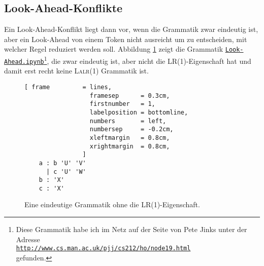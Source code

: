 \subsection{Look-Ahead-Konflikte}
Ein Look-Ahead-Konflikt liegt dann vor, wenn die Grammatik zwar eindeutig ist, aber ein Look-Ahead von einem
Token nicht ausreicht um zu entscheiden,  mit welcher Regel reduziert werden soll.  Abbildung 
\ref{fig:lr-conflict.g} zeigt die Grammatik 
\href{https://github.com/karlstroetmann/Formal-Languages/blob/master/Python/Chapter-10/Look-Ahead.ipynb}{\texttt{Look-Ahead.ipynb}}\footnote{ 
Diese Grammatik habe ich im Netz auf der Seite von Pete Jinks unter der Adresse
\\[0.1cm]
\hspace*{1.3cm}
\href{http://www.cs.man.ac.uk/~pjj/cs212/ho/node19.html}{\texttt{http://www.cs.man.ac.uk/pjj/cs212/ho/node19.html}}
\\[0.1cm]
gefunden.},
die zwar eindeutig ist, aber nicht die LR(1)-Eigenschaft hat und damit erst recht keine \textsc{Lalr}(1) Grammatik ist.

\begin{figure}[!ht]
\centering
\begin{Verbatim}[ frame         = lines, 
                  framesep      = 0.3cm, 
                  firstnumber   = 1,
                  labelposition = bottomline,
                  numbers       = left,
                  numbersep     = -0.2cm,
                  xleftmargin   = 0.8cm,
                  xrightmargin  = 0.8cm,
                ]
    a : b 'U' 'V'
      | c 'U' 'W'
    b : 'X'
    c : 'X'   
\end{Verbatim}
\vspace*{-0.3cm}
\caption{Eine eindeutige Grammatik ohne die LR(1)-Eigenschaft.}
\label{fig:lr-conflict.g}
\end{figure}


